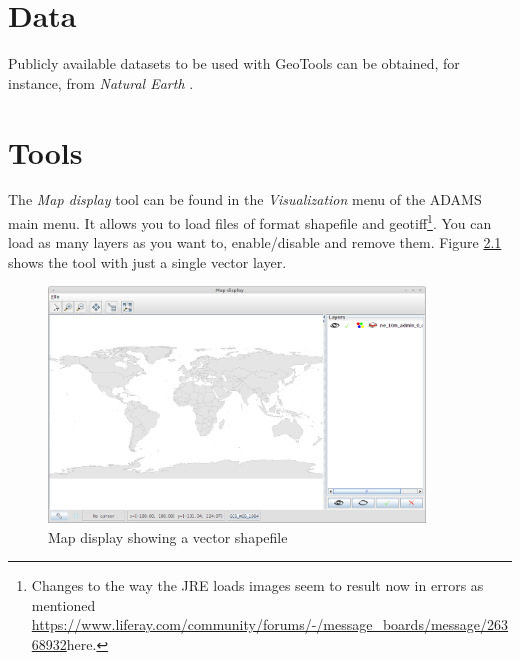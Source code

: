 \documentclass[a4paper]{book}
\begin{document}
\chapter{Data}
Publicly available datasets to be used with GeoTools can be obtained, for
instance, from \textit{Natural Earth} \cite{naturalearth}.

\chapter{Tools}
The \textit{Map display} tool can be found in the \textit{Visualization} menu
of the ADAMS main menu. It allows you to load files of format shapefile and 
geotiff\footnote{Changes to the way the JRE loads images seem to result now
in errors as mentioned \url{https://www.liferay.com/community/forums/-/message_boards/message/26368932}{here}.}.
You can load as many layers as you want to, enable/disable and remove them.
Figure \ref{mapdisplay-vector} shows the tool with just a single vector layer.

\begin{figure}[htb]
  \centering
  \includegraphics[width=10.0cm]{images/map_vector.png}
  \caption{Map display showing a vector shapefile}
  \label{mapdisplay-vector}
\end{figure}


\end{document}
